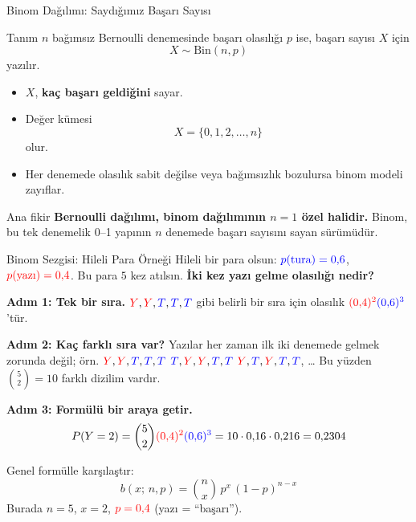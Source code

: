 \documentclass[light]{lutbeamer}
\begin{document}
\begin{frame}{Binom Dağılımı: Saydığımız Başarı Sayısı}
    \scriptsize
    \begin{block}{Tanım}
        \(n\) bağımsız Bernoulli denemesinde başarı olasılığı \(p\) ise,
        başarı sayısı \(X\) için
        \[
        X \sim \mathrm{Bin}(n,p)
        \]
        yazılır.
    \end{block}

    \begin{itemize}
        \item \(X\), \textbf{kaç başarı geldiğini} sayar.
        \item Değer kümesi
        \[
        X=\{0,1,2,\dots,n\}
        \]
        olur.
        \item Her denemede olasılık sabit değilse veya bağımsızlık bozulursa binom modeli zayıflar.
    \end{itemize}

    \begin{block}{Ana fikir}
        \textbf{Bernoulli dağılımı, binom dağılımının \(n=1\) özel halidir.}
        Binom, bu tek denemelik 0--1 yapının \(n\) denemede başarı sayısını sayan sürümüdür.
    \end{block}
\end{frame}

\begin{frame}{Binom Sezgisi: Hileli Para Örneği}
    \footnotesize
    Hileli bir para olsun:
    \(\textcolor{blue}{p(\text{tura}) = 0{,}6}\),
    \(\textcolor{red}{p(\text{yazı}) = 0{,}4}\).
    Bu para \(5\) kez atılsın. \textbf{İki kez yazı gelme olasılığı nedir?}

    \textbf{Adım 1: Tek bir sıra.}
    \(\textcolor{red}{Y},\textcolor{red}{Y},\textcolor{blue}{T},\textcolor{blue}{T},\textcolor{blue}{T}\) gibi belirli bir sıra için olasılık
    \(\textcolor{red}{(0{,}4)^{2}}\textcolor{blue}{(0{,}6)^{3}}\)'tür.

    \textbf{Adım 2: Kaç farklı sıra var?}
    Yazılar her zaman ilk iki denemede gelmek zorunda değil; örn.
    \(\textcolor{red}{Y},\textcolor{red}{Y},\textcolor{blue}{T},\textcolor{blue}{T},\textcolor{blue}{T}\)\qquad
    \(\textcolor{blue}{T},\textcolor{red}{Y},\textcolor{red}{Y},\textcolor{blue}{T},\textcolor{blue}{T}\)\qquad
    \(\textcolor{red}{Y},\textcolor{blue}{T},\textcolor{red}{Y},\textcolor{blue}{T},\textcolor{blue}{T}\), \dots
    Bu yüzden \(\binom{5}{2} = 10\) farklı dizilim vardır.

    \textbf{Adım 3: Formülü bir araya getir.}
    \[
    P(Y=2)=\binom{5}{2}\textcolor{red}{(0{,}4)^{2}}\textcolor{blue}{(0{,}6)^{3}}=10\cdot 0{,}16\cdot 0{,}216=0{,}2304
    \]

    Genel formülle karşılaştır:
    \[
    b(x;\,n,p) = \binom{n}{x}\,p^{x}\,(1-p)^{n-x}
    \]
    Burada \(n=5\), \(x=2\), \(\textcolor{red}{p=0{,}4}\) (yazı = ``başarı'').
\end{frame}
\end{document}
